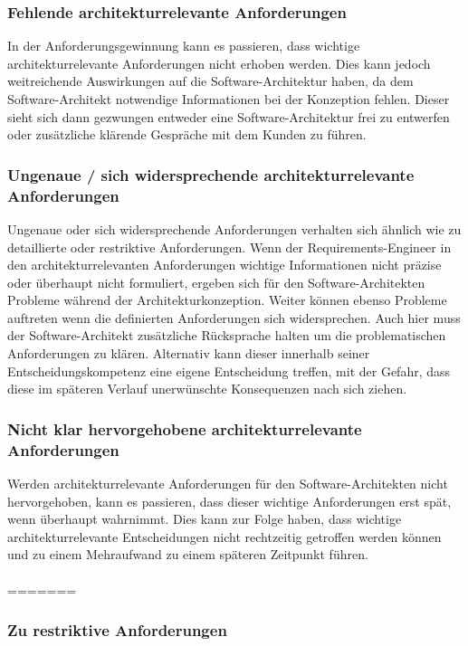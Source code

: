 \subsubsection{Fehlende architekturrelevante Anforderungen}
In der Anforderungsgewinnung kann es passieren, dass wichtige architekturrelevante Anforderungen nicht erhoben werden. Dies kann jedoch weitreichende Auswirkungen auf die Software-Architektur haben, da dem Software-Architekt notwendige Informationen bei der Konzeption fehlen. Dieser sieht sich dann gezwungen entweder eine Software-Architektur frei zu entwerfen oder zusätzliche klärende Gespräche mit dem Kunden zu führen.

\subsubsection{Ungenaue / sich widersprechende architekturrelevante Anforderungen}
Ungenaue oder sich widersprechende Anforderungen verhalten sich ähnlich wie zu detaillierte oder restriktive Anforderungen. Wenn der Requirements-Engineer in den architekturrelevanten Anforderungen wichtige Informationen nicht präzise oder überhaupt nicht formuliert, ergeben sich für den Software-Architekten Probleme während der Architekturkonzeption. Weiter können ebenso Probleme auftreten wenn die definierten Anforderungen sich widersprechen. Auch hier muss der Software-Architekt zusätzliche Rücksprache halten um die problematischen Anforderungen zu klären. Alternativ kann dieser innerhalb seiner Entscheidungskompetenz eine eigene Entscheidung treffen, mit der Gefahr, dass diese im späteren Verlauf unerwünschte Konsequenzen nach sich ziehen.

\subsubsection{Nicht klar hervorgehobene architekturrelevante Anforderungen}
Werden architekturrelevante Anforderungen für den Software-Architekten nicht hervorgehoben, kann es passieren, dass dieser wichtige Anforderungen erst spät, wenn überhaupt wahrnimmt. Dies kann zur Folge haben, dass wichtige architekturrelevante Entscheidungen nicht rechtzeitig getroffen werden können und zu einem Mehraufwand zu einem späteren Zeitpunkt führen.\\
\\
=======
\subsubsection{Zu restriktive Anforderungen}

